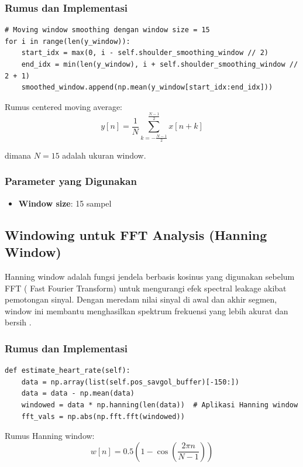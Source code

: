 \documentclass[11pt,a4paper]{article}
\begin{document}
\subsubsection{Rumus dan Implementasi}
    \begin{lstlisting}
# Moving window smoothing dengan window size = 15
for i in range(len(y_window)):
    start_idx = max(0, i - self.shoulder_smoothing_window // 2)
    end_idx = min(len(y_window), i + self.shoulder_smoothing_window // 2 + 1)
    smoothed_window.append(np.mean(y_window[start_idx:end_idx]))
    \end{lstlisting}

Rumus centered moving average:
$$y[n] = \frac{1}{N} \sum_{k=-\frac{N-1}{2}}^{\frac{N-1}{2}} x[n+k]$$

dimana $N = 15$ adalah ukuran window.

\subsubsection{Parameter yang Digunakan}
\begin{itemize}
    \item \textbf{Window size}: 15 sampel
\end{itemize}

\subsection{Windowing untuk FFT Analysis (Hanning Window)}
Hanning window adalah fungsi jendela berbasis kosinus yang digunakan sebelum FFT ( Fast Fourier Transform) untuk mengurangi efek spectral leakage akibat pemotongan sinyal. Dengan meredam nilai sinyal di awal dan akhir segmen, window ini membantu menghasilkan spektrum frekuensi yang lebih akurat dan bersih \cite{scipy2024}. 

\subsubsection{Rumus dan Implementasi}
    \begin{lstlisting}
def estimate_heart_rate(self):
    data = np.array(list(self.pos_savgol_buffer)[-150:])
    data = data - np.mean(data)
    windowed = data * np.hanning(len(data))  # Aplikasi Hanning window
    fft_vals = np.abs(np.fft.fft(windowed))
    \end{lstlisting}

Rumus Hanning window:
$$w[n] = 0.5 \left(1 - \cos\left(\frac{2\pi n}{N-1}\right)\right)$$
\end{document}
